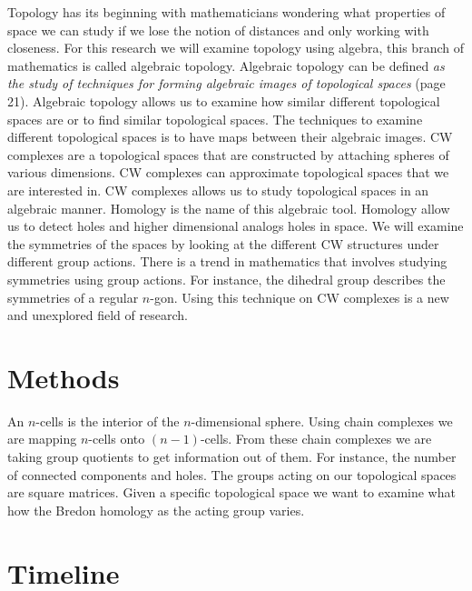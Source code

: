 \documentclass[12pt]{article}
\begin{document}
Topology has its beginning with mathematicians wondering what properties of space we can study if we lose the notion of distances and only working with closeness.\cite{Allen_Hatcher_2001} For this research we will examine topology using algebra, this branch of mathematics is called algebraic topology.\cite{Allen_Hatcher_2001} Algebraic topology can be defined \textit{as the study of techniques for forming
algebraic images of topological spaces}  (page 21).\cite{Allen_Hatcher_2001} Algebraic topology allows us to examine how similar different topological spaces are or to find similar topological spaces.\cite{Allen_Hatcher_2001} The techniques to examine different topological spaces is to have maps between their algebraic images.\cite{Allen_Hatcher_2001}\newline
CW complexes are a topological spaces that are constructed by attaching spheres of various dimensions.\cite{Allen_Hatcher_2001} CW complexes can approximate topological spaces that we are interested in. CW complexes allows us to study topological spaces in an algebraic manner. Homology is the name of this algebraic tool. Homology allow us to detect holes and higher dimensional analogs holes in space.\newline
We will examine the symmetries of the spaces by looking at the different CW structures under different group actions. There is a trend in mathematics that involves studying symmetries using group actions. For instance, the dihedral group describes the symmetries of a regular $n$-gon. Using this technique on CW complexes is a new and unexplored field of research.

\section{Methods}
An $n$-cells is the interior of the $n$-dimensional sphere. Using chain complexes we are mapping $n$-cells onto $(n-1)$-cells. From these chain complexes we are taking group quotients to get information out of them. For instance, the number of connected components and holes.\cite{Beaudry}\newline
The groups acting on our topological spaces are square matrices. Given a specific topological space we want to examine what how the Bredon homology as the acting group varies.\cite{Beaudry}\newline

\section{Timeline}
\end{document}
